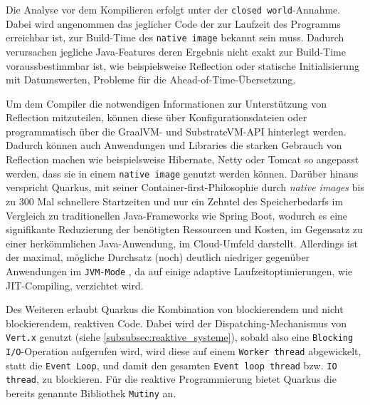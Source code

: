 Die Analyse vor dem Kompilieren erfolgt unter der \verb|closed world|-Annahme. Dabei wird angenommen das jeglicher Code der zur Laufzeit des Programms
erreichbar ist, zur Build-Time des \verb|native image| bekannt sein muss. Dadurch verursachen jegliche Java-Features deren Ergebnis nicht exakt
zur Build-Time voraussbestimmbar ist, wie beispielsweise Reflection oder statische Initialisierung mit Datumswerten, Probleme für die Ahead-of-Time-Übersetzung.

Um dem Compiler die notwendigen Informationen zur Unterstützung von Reflection mitzuteilen, können
diese über Konfigurationsdateien oder programmatisch über die GraalVM- und SubstrateVM-API hinterlegt werden.
Dadurch können auch Anwendungen und Libraries die starken Gebrauch von Reflection machen wie beispielsweise Hibernate, Netty oder Tomcat
so angepasst werden, dass sie in einem \verb|native image| genutzt werden können.
\parencite{GraalVMNativeImage}
Darüber hinaus verspricht Quarkus, mit seiner Container-first-Philosophie durch \textit{native images} bis zu 300 Mal schnellere Startzeiten
und nur ein Zehntel des Speicherbedarfs im Vergleich zu traditionellen Java-Frameworks wie Spring Boot, wodurch es eine signifikante Reduzierung
der benötigten Ressourcen und Kosten, im Gegensatz zu einer herkömmlichen Java-Anwendung, im Cloud-Umfeld darstellt.
\parencite{RedHatQuarkusInfografik}
Allerdings ist der maximal, mögliche Durchsatz (noch) deutlich niedriger gegenüber Anwendungen im \verb|JVM-Mode| , da auf einige adaptive
Laufzeitoptimierungen, wie JIT-Compiling, verzichtet wird.

Des Weiteren erlaubt Quarkus die Kombination von blockierendem und nicht blockierendem, reaktiven Code.
Dabei wird der Dispatching-Mechanismus von \verb|Vert.x| genutzt (siehe \ref{subsubsec:reaktive_systeme}), sobald also eine
\verb|Blocking I/O|-Operation aufgerufen wird, wird diese auf einem \verb|Worker thread| abgewickelt, statt die \verb|Event Loop|, und damit den
gesamten \verb|Event loop thread| bzw. \verb|IO thread|, zu blockieren.
Für die reaktive Programmierung bietet Quarkus die bereits genannte Bibliothek \verb|Mutiny| an.\parencite{Quarkus}

